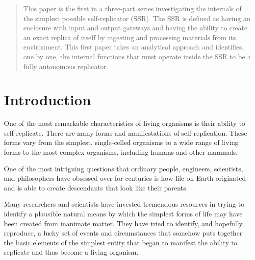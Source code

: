 
\newcommand\migneafigurewide[3]{
	\begin{figure}
		\centering
		\texttt{[image: \#1]}
		\caption{{#2}}
		\label{#3}
	\end{figure}
}
\newcommand\migneafigure[3]{
	\begin{figure}
		\centering
		\texttt{[image: \#1]}
		\caption{{#2}}
		\label{#3}
	\end{figure}
}
\newcommand\mterm[1]{\emph{#1}}
\newcommand\memph[1]{\emph{#1}}


\begin{abstract}
This paper is the first in a three-part series investigating the internals 
of the simplest possible self-replicator (SSR). 
The SSR is defined as having an enclosure with input
and output gateways and having the ability to create an exact replica
of itself by ingesting and processing materials from its
environment. This first paper takes an analytical approach and identifies, one
by one, the internal functions that must operate inside
the SSR to be a fully autonomous replicator.
\end{abstract}

\section{Introduction}

One of the most remarkable characteristics of living organisms is
their ability to self-replicate. There are many forms and
manifestations of self-replication. These forms vary
from the simplest, single-celled organisms to a wide range of
living forms to the most complex organisms, including humans and
other mammals.

One of the most intriguing questions that ordinary people, engineers,
scientists, and philosophers have obsessed over for centuries is how life on Earth
originated and is able
to create
descendants that look like their parents.

Many researchers and scientists
have invested tremendous resources in trying to identify a plausible
natural means by which the simplest forms of life may have been created
from inanimate matter. They have tried to identify, and hopefully
reproduce, a lucky set of events and circumstances that somehow puts
together the basic elements of the simplest entity that began
to manifest the ability to replicate and thus become a living organism.


